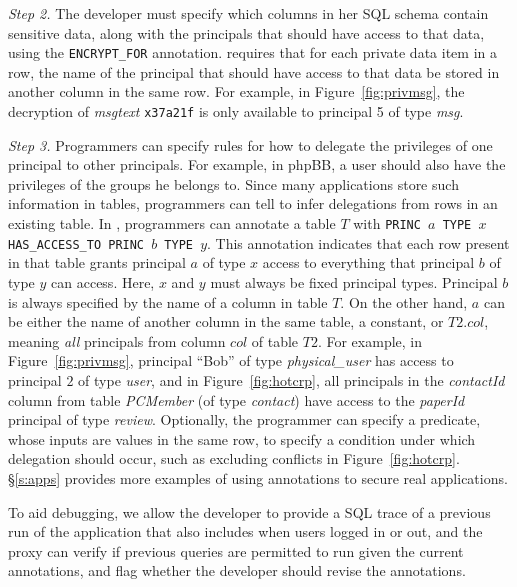 {\em Step 2.} The developer must specify which columns in her SQL
schema contain sensitive data, along with the principals that should
have access to that data, using the {\tt \small ENCRYPT\_FOR}
annotation.  \name requires that for each private data item in a row,
the name of the principal that should have access to that data be
stored in another column in the same row.
For example, in Figure~\ref{fig:privmsg}, the decryption of {\em msgtext}
\texttt{x37a21f} is only available to principal 5 of type {\em msg}.

{\em Step 3.}  Programmers can specify rules for how to delegate the
privileges of one principal to other principals.  For example, in
phpBB, a user should also have the privileges of the groups he belongs
to.  Since many applications store such information in tables,
programmers can tell \name to infer delegations from rows in an
existing table.  In \name, programmers can annotate a table $T$ with
{\tt \small PRINC $a$ TYPE $x$ HAS\_ACCESS\_TO PRINC $b$ TYPE $y$}.
This annotation indicates that each row present in that table grants
principal $a$ of type $x$ access to everything that principal $b$ of
type $y$ can access.  Here, $x$ and $y$ must always be fixed principal
types.  Principal $b$ is always specified by the name of a column in
table $T$.  On the other hand, $a$ can be either the name of another
column in the same table, a constant, or $T2.col$, meaning {\em all}
principals from column $col$ of table $T2$.  For example, in
Figure~\ref{fig:privmsg}, principal ``Bob'' of type {\em
  physical\_user} has access to principal $2$ of type {\em user}, and
in Figure~\ref{fig:hotcrp}, all principals in the {\em contactId}
column from table {\em PCMember} (of type {\em contact}) have access
to the {\em paperId} principal of type {\em review}.  Optionally, the
programmer can specify a predicate, whose inputs are values in the
same row, to specify a condition under which delegation should occur,
such as excluding conflicts in Figure~\ref{fig:hotcrp}.
\S\ref{s:apps} provides more examples of using annotations to secure
real applications.



To aid debugging, we allow the developer to provide a SQL trace of a
previous run of the application that also includes when users logged
in or out, and the proxy can verify if previous queries are permitted
to run given the current annotations, and flag whether the developer
should revise the annotations.

